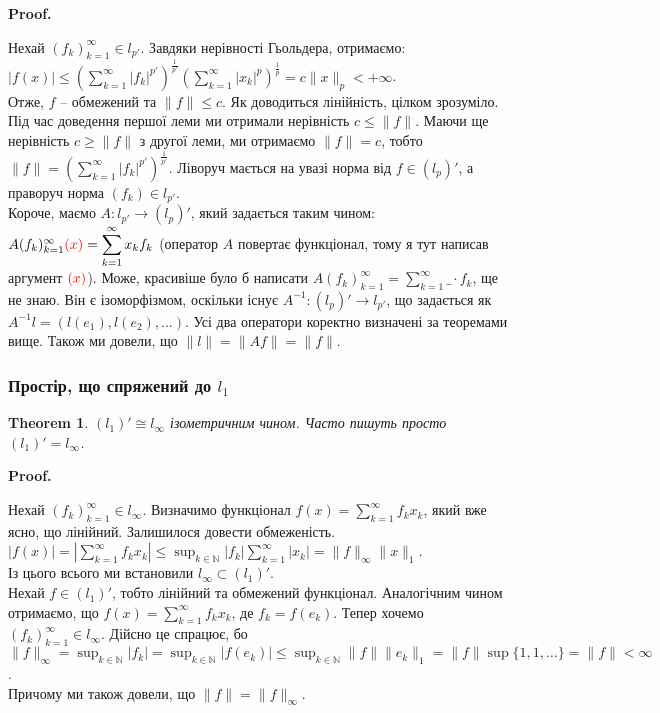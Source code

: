 \documentclass[a4paper, 10pt]{article}
\makeatletter
\theoremstyle{theoremdd}
\newtheorem{theorem}{Theorem}[subsection]
\theoremstyle{theoremdd}
\theoremstyle{theoremdd}
\theoremstyle{theoremdd}
\theoremstyle{theoremdd}
\theoremstyle{theoremdd}
\theoremstyle{theoremdd}
\theoremstyle{theoremdd}
\renewenvironment{proof}[1][Proof.\\]{\par
\pushQED{\hfill \qed}%
\normalfont \topsep6\p@\@plus6\p@\relax
\trivlist
\item\relax
{\bfseries
#1\@addpunct{.}}\hspace\labelsep\ignorespaces
}{%
\popQED\endtrivlist\@endpefalse
}
\makeatother
\begin{document}
\begin{proof}
Нехай $(f_k)_{k=1}^\infty \in l_{p'}$. Завдяки нерівності Гьольдера, отримаємо:\\
$\displaystyle |f(x)| \leq \left( \sum_{k=1}^\infty |f_k|^{p'} \right)^{\frac{1}{p'}} \left( \sum_{k=1}^\infty |x_k|^p \right)^{\frac{1}{p}} = c \| x \|_p < +\infty$.\\
Отже, $f$ -- обмежений та $\|f\| \leq c$. Як доводиться лінійність, цілком зрозуміло.
\end{proof}
\noindent
Під час доведення першої леми ми отримали нерівність $c \leq \|f\|$. Маючи ще нерівність $c \geq \|f\|$ з другої леми, ми отримаємо $\|f\| = c$, тобто $\|f\| =  \displaystyle\left( \sum_{k=1}^\infty |f_k|^{p'} \right)^{\frac{1}{p'}}$. Ліворуч мається на увазі норма від $f \in (l_p)'$, а праворуч норма $(f_k) \in l_{p'}$.
\bigskip \\
Короче, маємо $A \colon l_{p'} \to (l_p)'$, який задається таким чином: $A (f_k)_{k=1}^\infty \color{red}(x) \color{black} = \displaystyle\sum_{k=1}^\infty x_k f_k$ (оператор $A$ повертає функціонал, тому я тут написав аргумент $\color{red}(x)$). Може, красивіше було б написати $A (f_k)_{k=1}^\infty = \displaystyle\sum_{k=1}^\infty \_ \cdot f_k$, ще не знаю. Він є ізоморфізмом, оскільки існує $A^{-1} \colon (l_p)' \to l_{p'}$, що задається як $A^{-1}l = (l(e_1),l(e_2),\dots)$. Усі два оператори коректно визначені за теоремами вище. Також ми довели, що $\|l\| = \| Af \| = \| f \|$.

\subsubsection{Простір, що спряжений до $l_1$}
\begin{theorem}
$(l_1)' \cong l_\infty$ ізометричним чином. Часто пишуть просто $(l_1)' = l_\infty$.
\end{theorem}

\begin{proof}
Нехай $(f_k)^{\infty}_{k=1} \in l_{\infty}$. Визначимо функціонал $f(x) = \displaystyle\sum_{k=1}^\infty f_k x_k$, який вже ясно, що лінійний. Залишилося довести обмеженість.\\
$|f(x)| = \displaystyle \left| \sum_{k=1}^\infty f_k x_k \right| \leq \sup_{k \in \mathbb{N}} |f_k| \sum_{k=1}^\infty |x_k| = \|f\|_\infty \|x\|_1$.\\
Із цього всього ми встановили $l_\infty \subset (l_1)'$.\\
Нехай $f \in (l_1)'$, тобто лінійний та обмежений функціонал. Аналогічним чином отримаємо, що $f(x) = \displaystyle\sum_{k=1}^\infty f_k x_k$, де $f_k = f(e_k)$. Тепер хочемо $(f_k)^{\infty}_{k=1} \in l_\infty$. Дійсно це спрацює, бо\\
$\|f\|_\infty = \displaystyle\sup_{k \in \mathbb{N}} |f_k| = \sup_{k \in \mathbb{N}} |f(e_k)| \leq \sup_{k \in \mathbb{N}} \|f\| \|e_k\|_1 = \|f\| \sup \{1,1,\dots\} = \|f\| < \infty$.\\
Причому ми також довели, що $\|f\| = \|f\|_\infty$.
\end{proof}
\end{document}
